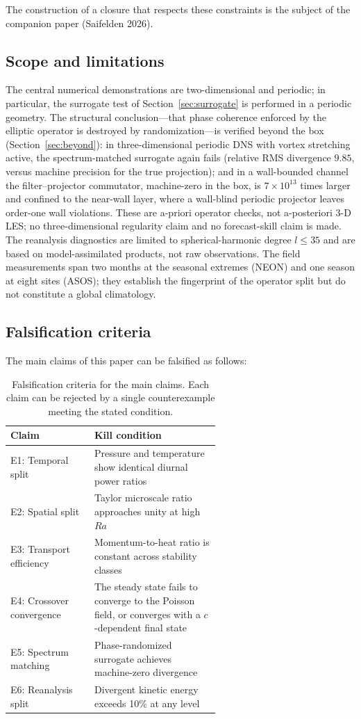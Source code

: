 \documentclass[11pt]{article}
\begin{document}
The construction of a closure that respects these constraints is the subject of the companion paper (Saifelden 2026).

\subsection{Scope and limitations}
\label{sec:scope}

The central numerical demonstrations are two-dimensional and periodic; in particular, the surrogate test of Section~\ref{sec:surrogate} is performed in a periodic geometry. The structural conclusion---that phase coherence enforced by the elliptic operator is destroyed by randomization---is verified beyond the box (Section~\ref{sec:beyond}): in three-dimensional periodic DNS with vortex stretching active, the spectrum-matched surrogate again fails (relative RMS divergence $9.85$, versus machine precision for the true projection); and in a wall-bounded channel the filter--projector commutator, machine-zero in the box, is $7\times10^{13}$ times larger and confined to the near-wall layer, where a wall-blind periodic projector leaves order-one wall violations. These are a-priori operator checks, not a-posteriori 3-D LES; no three-dimensional regularity claim and no forecast-skill claim is made. The reanalysis diagnostics are limited to spherical-harmonic degree $l \leq 35$ and are based on model-assimilated products, not raw observations. The field measurements span two months at the seasonal extremes (NEON) and one season at eight sites (ASOS); they establish the fingerprint of the operator split but do not constitute a global climatology.

\subsection{Falsification criteria}

The main claims of this paper can be falsified as follows:

\begin{table}[t]
\centering
\caption{Falsification criteria for the main claims. Each claim can be rejected by a single counterexample meeting the stated condition.}
\label{tab:kill}
\begin{tabular}{@{}l p{0.60\linewidth}@{}}
\toprule
Claim & Kill condition \\
\midrule
E1: Temporal split & Pressure and temperature show identical diurnal power ratios \\
E2: Spatial split & Taylor microscale ratio approaches unity at high $Ra$ \\
E3: Transport efficiency & Momentum-to-heat ratio is constant across stability classes \\
E4: Crossover convergence & The steady state fails to converge to the Poisson field, or converges with a $c$-dependent final state \\
E5: Spectrum matching & Phase-randomized surrogate achieves machine-zero divergence \\
E6: Reanalysis split & Divergent kinetic energy exceeds 10\% at any level \\
\bottomrule
\end{tabular}
\end{table}
\end{document}
